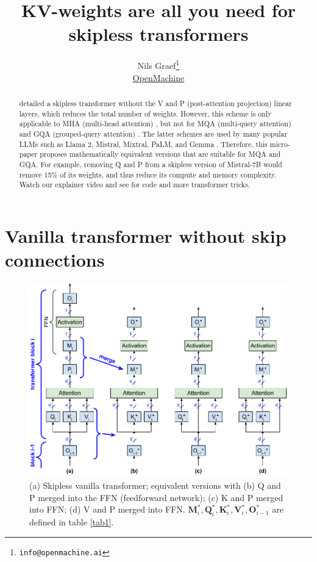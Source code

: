 \documentclass{article}
\title{KV-weights are all you need for skipless transformers}
\author{Nils Graef\thanks{\texttt{info@openmachine.ai}} \\
  \href{https://openmachine.ai}{OpenMachine}}
\newcommand{\mat}[1]{\mathbf{#1}}  %
\def\Q{\mat{Q}_i}
\def\K{\mat{K}_i}
\def\V{\mat{V}_i}
\def\O{\mat{O}_{i-1}}
\def\M{\mat{M}_i}
\begin{document}
 \maketitle

\begin{abstract}
\citet{simplified} detailed a skipless transformer without the V and P (post-attention projection) linear layers, which reduces the total number of weights. However, this scheme is only applicable to MHA (multi-head attention) \cite{vanilla}, but not for MQA (multi-query attention) \cite{MQA} and GQA (grouped-query attention) \cite{GQA}. The latter schemes are used by many popular LLMs such as Llama 2, Mistral, Mixtral, PaLM, and Gemma \cite{Llama2, mistral, mixtral, PaLM, gemma}. Therefore, this micro-paper \cite{micro-paper} proposes mathematically equivalent versions that are suitable for MQA and GQA. For example, removing Q and P from a skipless version of Mistral-7B would remove 15\% of its weights, and thus reduce its compute and memory complexity. Watch our explainer video \citep{remove-video} and see \citep{tricks, precompute} for code and more transformer tricks.
\end{abstract}

\section{Vanilla transformer without skip connections}

\begin{figure}[h!] \centering %
  \includegraphics[scale=0.87]{../doc/fig/removeWeights_fig1.pdf}
  \caption{(a) Skipless vanilla transformer; equivalent versions with (b) Q and P merged into the FFN (feedforward network); (c) K and P merged into FFN; (d) V and P merged into FFN. $\M^*, \Q^*, \K^*, \V^*, \O^*$ are defined in table \ref{tab1}.}
\label{fig1} \end{figure}
\end{document}
